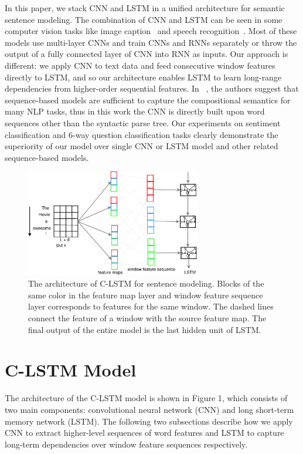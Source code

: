 \documentclass[11pt,letterpaper]{article}
\begin{document}
\indent In this paper, we stack CNN and LSTM in a unified
architecture for semantic sentence modeling. The combination of CNN and
LSTM can be seen in some computer vision tasks like image
caption~\cite{caption} and speech recognition~\cite{saina}. Most of
these models use multi-layer CNNs and train CNNs and RNNs separately or
throw the output of a fully connected layer of CNN into RNN as inputs.
Our approach is different: we apply CNN to text data and feed
consecutive window features directly to LSTM, and so our architecture
enables LSTM to
learn long-range dependencies from higher-order sequential features. In
~\cite{lijiwei}, the authors suggest that sequence-based models are
sufficient to capture the compositional semantics for many NLP tasks,
thus in this work the CNN is directly built upon word sequences other
than the syntactic parse tree. Our experiments on sentiment
classification and 6-way question classification tasks clearly
demonstrate the
superiority of our model over single CNN or LSTM model and other related
sequence-based models.
\begin{figure}[t]
\centering
\includegraphics[width=3in]{crnn.eps}
\caption{The architecture of C-LSTM for sentence modeling. Blocks of the
same color in the feature map layer and window feature sequence layer
corresponds to features for the same window. The dashed lines connect
the feature of a window with the source feature map.  The final output
of the entire model is the last hidden unit of LSTM.}
\end{figure}

\section{C-LSTM Model}
The architecture of the C-LSTM model is shown in Figure 1, which
consists of two main components: convolutional neural network (CNN) and long
short-term memory network (LSTM). The following two subsections
describe how we apply CNN to extract higher-level sequences of word
features and LSTM to capture long-term dependencies over window feature
sequences respectively.
\end{document}
